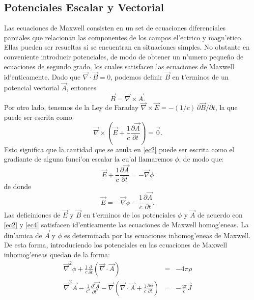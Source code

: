 \subsection{Potenciales Escalar y Vectorial}
Las ecuaciones de Maxwell consisten en un set de ecuaciones diferenciales parciales que relacionan las componentes de los campos el'ectrico y magn'etico. Ellas pueden ser resueltas si se encuentran en situaciones simples. No obstante en conveniente introducir potenciales, de modo de obtener un n'umero peque\~no de ecuaciones de segundo grado, los cuales satisfacen las ecuaciones de Maxwell id'enticamente.
Dado que $\vec{\nabla}\cdot\vec{B}=0$, podemos definir $\vec{B}$ en t'erminos de un potencial vectorial $\vec{A}$, entonces
\begin{equation}
\vec{B}=\vec{\nabla}\times\vec{A}.
\end{equation}
Por otro lado, tenemos  de la Ley de Faraday $\vec{\nabla}\times\vec{E}=-(1/c)\,\partial\vec{B}/\partial t$, la que puede ser escrita como
\begin{equation}
\vec{\nabla}\times\left(\vec{E}+\frac{1}{c}\frac{\partial\vec{A}}{\partial t}\right)=\vec{0}. \label{ec2}
\end{equation}
Esto significa que la cantidad que se anula en \eqref{ec2} puede ser escrita como el gradiante de alguna funci'on escalar la cu'al llamaremos $\phi$, de modo que:
\begin{equation}
\vec{E}+\frac{1}{c}\frac{\partial\vec{A}}{\partial t}=-\vec{\nabla}\phi
\end{equation}
de donde
\begin{equation}
\vec{E}=-\vec{\nabla}\phi-\frac{1}{c}\frac{\partial\vec{A}}{\partial t}. \label{ec4}
\end{equation}
Las deficiniones de $\vec{E}$ y $\vec{B}$ en t'erminos de los potenciales $\phi$ y $\vec{A}$ de acuerdo con \eqref{ec2} y \eqref{ec4} satisfacen id'enticamente las ecuaciones de Maxwell homog'eneas. La din'amica de $\vec{A}$ y $\phi$ es determinada por las ecuaciones inhomog'eneas de Maxwell.
De esta forma, introduciendo los potenciales en las ecuaciones de Maxwell inhomog'eneas quedan de la forma:
\begin{eqnarray}
\vec{\nabla}^2\phi+\frac{1}{c}\frac{\partial}{\partial t}(\vec{\nabla}\cdot\vec{A})&=&-4\pi \rho \label{ec5} \\
\vec{\nabla}^2\vec{A}-\frac{1}{c^2}\frac{\partial^2 \vec{A}}{\partial t^2}-\vec{\nabla}\left(\vec{\nabla}\cdot\vec{A}+\frac{1}{c}\frac{\partial \phi}{\partial t}\right)&=&-\frac{4\pi}{c}\vec{J} \label{ec6}
\end{eqnarray}
